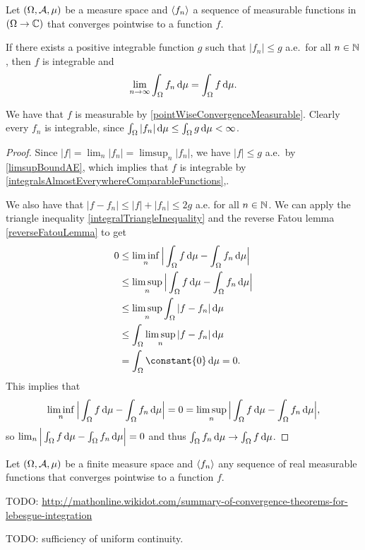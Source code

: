 \begin{theorem} \label{dominatedConvergence}
Let $\sSet{\Omega, \mathcal{A}, \mu}$ be a measure space and $\left\langle f_n \right\rangle$ a sequence of measurable functions in $(\Omega\to\mathbb{C})$ that converges pointwise to a function $f$.

If there exists a positive integrable function $g$ such that $|f_n| \leq g$ a.e.\ for all $n\in \mathbb{N}$, then $f$ is integrable and
\[ \lim_{n\to \infty}\int_\Omega f_n \operatorname{d \!}{\mu} = \int_\Omega f\operatorname{d \!}{\mu}. \]
\end{theorem}
We have that $f$ is measurable by \ref{pointWiseConvergenceMeasurable}. Clearly every $f_n$ is integrable, since $\int_\Omega |f_n|\operatorname{d \!}{\mu} \leq \int_\Omega g \operatorname{d \!}{\mu} < \infty$.
\begin{proof}
Since $|f| = \lim_n |f_n| = \limsup_n |f_n|$, we have $|f| \leq g$ a.e.\ by \ref{limsupBoundAE}, which implies that $f$ is integrable by \ref{integralsAlmostEverywhereComparableFunctions},.

We also have that $|f-f_n| \leq |f| + |f_n| \leq 2g$ a.e. for all $n\in\mathbb{N}$.
We can apply the triangle inequality \ref{integralTriangleInequality} and the reverse Fatou lemma \ref{reverseFatouLemma} to get
\begin{align*}
0 &\leq \liminf_n\Big|\int_\Omega f \diff{\mu} - \int_\Omega f_n \diff{\mu}\Big| \\
&\leq \limsup_n\Big|\int_\Omega f \diff{\mu} - \int_\Omega f_n \diff{\mu}\Big| \\
&\leq \limsup_n\int_\Omega |f-f_n| \diff{\mu} \\
&\leq \int_\Omega \limsup_n |f-f_n| \diff{\mu} \\
&= \int_\Omega \constant{0} \diff{\mu} = 0.
\end{align*}
This implies that
\[ \liminf_n\Big|\int_\Omega f \operatorname{d \!}{\mu} - \int_\Omega f_n \operatorname{d \!}{\mu}\Big|  = 0 = \limsup_n\Big|\int_\Omega f \operatorname{d \!}{\mu} - \int_\Omega f_n \operatorname{d \!}{\mu}\Big|, \]
so $\lim_n\Big|\int_\Omega f \operatorname{d \!}{\mu} - \int_\Omega f_n \operatorname{d \!}{\mu}\Big| = 0$ and thus $\int_\Omega f_n \operatorname{d \!}{\mu} \to \int_\Omega f \operatorname{d \!}{\mu}$.
\end{proof}
\begin{corollary} \label{boundedConvergenceTheorem}
Let $\sSet{\Omega, \mathcal{A}, \mu}$ be a finite measure space and $\left\langle f_n \right\rangle$ any sequence of real measurable functions that converges pointwise to a function $f$.
\end{corollary}
TODO: \url{http://mathonline.wikidot.com/summary-of-convergence-theorems-for-lebesgue-integration}
\begin{corollary}
TODO: sufficiency of uniform continuity.
\end{corollary}

